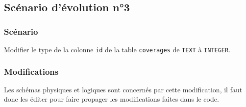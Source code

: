 \subsection{Scénario d'évolution n°3}
\subsubsection{Scénario}
Modifier le type de la colonne \texttt{id} de la table \texttt{coverages} de \texttt{TEXT} à \texttt{INTEGER}.
\subsubsection{Modifications}
Les schémas physiques et logiques sont concernés par cette modification, il faut donc les éditer pour faire propager les modifications faites dans le code.

